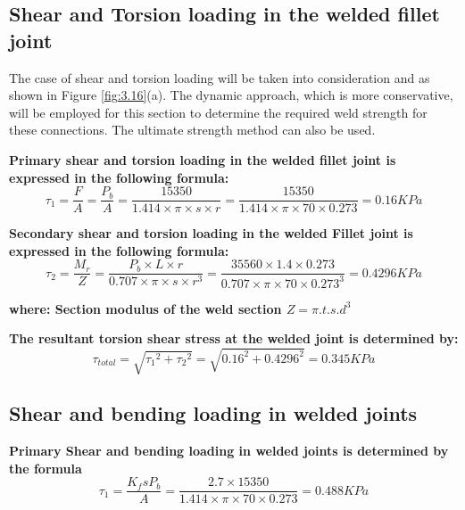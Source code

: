 {\subsection{Shear and Torsion loading in the welded fillet joint}

The case of shear and torsion loading will be taken into consideration and as shown in Figure \ref{fig:3.16}(a). The dynamic approach, which is more conservative, will be employed for this section to determine the required weld strength for these connections. The ultimate strength method can also be used.


\textbf{Primary shear and torsion loading in the welded fillet joint is expressed in the following formula: } 
\centering
\begin{equation}
\tau_1 = \frac{F}{A} =\frac{P_b}{A}=\frac{15350}{1.414\times\pi\times s\times r} =\frac{15350}{1.414\times\pi\times70\times0.273} = 0.16KPa
\end{equation}

\textbf{Secondary shear and torsion loading in the welded Fillet joint is expressed in the following formula: }
\centering
\begin{equation}
\tau_2 = \frac{{M}_{r}}{{Z}} = \frac{{P}_{{b}}\times{L}\times{r}}{{0}.{707}\times{\pi}\times{s}\times {r}^{3}} = \frac{{35560}\times{1}.{4}\times{0}.{273}}{{0}.{707}\times{\pi}\times{70}\times{{0}.{273}}^{3}} = 0.4296KPa 
\end{equation}

\textbf{where: Section modulus of the weld section  \(Z = \pi. t.s.d^3\)} 

 \textbf{The resultant torsion shear stress at the welded joint is determined by:}
\centering
\begin{equation}
\tau_{total} =\sqrt{{\tau_1}^2 + {\tau_2}^2} = \sqrt{{ 0.16}^2+{0.4296}^2} = 0.345KPa
\end{equation}




\subsection{Shear and bending loading in welded joints}



\textbf{Primary Shear and bending loading in welded joints is determined by the formula }
\centering
\begin{equation}
\tau_1=\frac{K_fs P_b}{A}   = \frac{2.7\times 15350}{ 1.414\times\pi \times 70 \times 0.273} = 0.488KPa
\end{equation}

}
